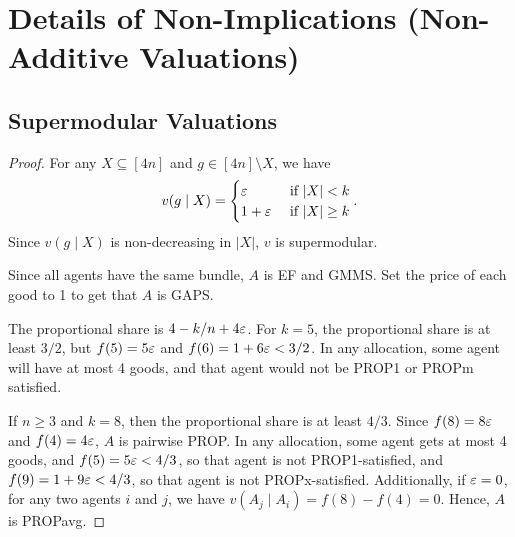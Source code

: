 \section{Details of Non-Implications (Non-Additive Valuations)}
\label{sec:cex-nonadd-extra}

\subsection{Supermodular Valuations}
\label{sec:cex-extra:supmod}

\begin{proof}
For any $X \subseteq [4n]$ and $g \in [4n] \setminus X$, we have
\[ v(g \mid X) = \begin{cases}
\varepsilon & \textrm{ if } |X| < k
\\ 1 + \varepsilon & \textrm{ if } |X| \ge k
\end{cases}. \]
Since $v(g \mid X)$ is non-decreasing in $|X|$, $v$ is supermodular.

Since all agents have the same bundle, $A$ is EF and GMMS.
Set the price of each good to 1 to get that $A$ is GAPS.

The proportional share is $4-k/n+4\varepsilon$.
For $k = 5$, the proportional share is at least $3/2$,
but $f(5) = 5\varepsilon$ and $f(6) = 1+6\varepsilon < 3/2$.
In any allocation, some agent will have at most 4 goods,
and that agent would not be PROP1 or PROPm satisfied.

If $n \ge 3$ and $k = 8$, then the proportional share is at least $4/3$.
Since $f(8) = 8\varepsilon$ and $f(4) = 4\varepsilon$, $A$ is pairwise PROP.
In any allocation, some agent gets at most 4 goods,
and $f(5) = 5\varepsilon < 4/3$, so that agent is not PROP1-satisfied,
and $f(9) = 1 + 9\varepsilon < 4/3$, so that agent is not PROPx-satisfied.
Additionally, if $\varepsilon = 0$, for any two agents $i$ and $j$,
we have $v(A_j \mid A_i) = f(8) - f(4) = 0$. Hence, $A$ is PROPavg.
\end{proof}

